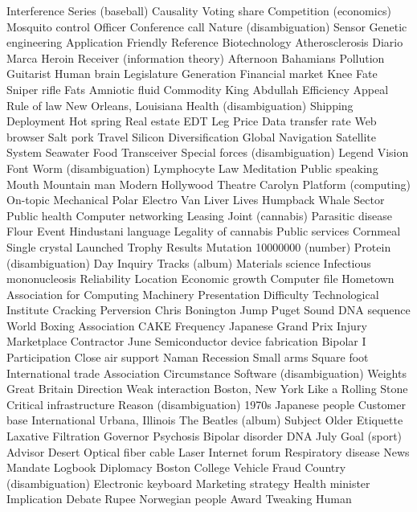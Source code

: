 Interference  Series (baseball)  Causality  
Voting share  Competition (economics)  Mosquito control  
Officer  Conference call  Nature (disambiguation)  
Sensor  Genetic engineering  Application  
Friendly  Reference  Biotechnology  
Atherosclerosis  Diario Marca  Heroin  
Receiver (information theory)  Afternoon  Bahamians  
Pollution  Guitarist  Human brain  
Legislature  Generation  Financial market  
Knee  Fate  Sniper rifle  
Fats  Amniotic fluid  Commodity  
King Abdullah  Efficiency  Appeal  
Rule of law  New Orleans, Louisiana  Health (disambiguation)  
Shipping  Deployment  Hot spring  
Real estate  EDT  Leg  
Price  Data transfer rate  Web browser  
Salt pork  Travel  Silicon  
Diversification  Global Navigation Satellite System  Seawater  
Food  Transceiver  Special forces (disambiguation)  
Legend  Vision  Font  
Worm (disambiguation)  Lymphocyte  Law  
Meditation  Public speaking  Mouth  
Mountain man  Modern  Hollywood Theatre  
Carolyn  Platform (computing)  On-topic  
Mechanical  Polar Electro  Van  
Liver  Lives  Humpback Whale  
Sector  Public health  Computer networking  
Leasing  Joint (cannabis)  Parasitic disease  
Flour  Event  Hindustani language  
Legality of cannabis  Public services  Cornmeal  
Single crystal  Launched  Trophy  
Results  Mutation  10000000 (number)  
Protein (disambiguation)  Day  Inquiry  
Tracks (album)  Materials science  Infectious mononucleosis  
Reliability  Location  Economic growth  
Computer file  Hometown  Association for Computing Machinery  
Presentation  Difficulty  Technological Institute  
Cracking  Perversion  Chris Bonington  
Jump  Puget Sound  DNA sequence  
World Boxing Association  CAKE  Frequency  
Japanese Grand Prix  Injury  Marketplace  
Contractor  June  Semiconductor device fabrication  
Bipolar I  Participation  Close air support  
Naman  Recession  Small arms  
Square foot  International trade  Association  
Circumstance  Software (disambiguation)  Weights  
Great Britain  Direction  Weak interaction  
Boston, New York  Like a Rolling Stone  Critical infrastructure  
Reason (disambiguation)  1970s  Japanese people  
Customer base  International  Urbana, Illinois  
The Beatles (album)  Subject  Older  
Etiquette  Laxative  Filtration  
Governor  Psychosis  Bipolar disorder  
DNA  July  Goal (sport)  
Advisor  Desert  Optical fiber cable  
Laser  Internet forum  Respiratory disease  
News  Mandate  Logbook  
Diplomacy  Boston College  Vehicle  
Fraud  Country (disambiguation)  Electronic keyboard  
Marketing strategy  Health minister  Implication  
Debate  Rupee  Norwegian people  
Award  Tweaking  Human  

